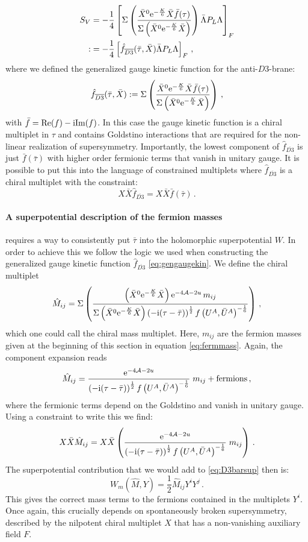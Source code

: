 \documentclass[a4paper,12pt,twoside,openright]{report}
\newcommand{\be}{\begin{equation}}
\newcommand{\ee}{\end{equation}}
\newcommand{\bea}{\begin{equation}\begin{aligned}}
\newcommand{\eea}{\end{aligned}\end{equation}}
\def\rmi{{\rm i}}
\def\rme{{\rm e}}
\def\rmre{{\rm Re}}
\def\rmim{{\rm Im}}
\begin{document}
\bea 
S_V &= -\frac{1}{4} \left[\Sigma\left(\frac{\bar{X}^0 \rme^{-\frac{K}{6}} \bar{X} \bar{f}(\tau)}{\Sigma \left(\bar{X}^0\rme^{-\frac{K}{6}}\bar{X}\right)}\right)\bar{\Lambda}P_L\Lambda\right]_F\\
:&= -\frac{1}{4} \left[\hat{f}_{\overline{D3}}(\bar{\tau},\bar{X})\bar{\Lambda}P_L\Lambda\right]_F\,,
\eea 
where we defined the generalized gauge kinetic function for the anti-$D3$-brane:
\bea 
\hat{f}_{\overline{D3}}(\bar{\tau},\bar{X}) := \Sigma\left(\frac{\bar{X}^0 \rme^{-\frac{K}{6}} \bar{X} \bar{f}(\tau)}{\Sigma \left(\bar{X}^0\rme^{-\frac{K}{6}}\bar{X}\right)}\right)\,,
\label{eq:gengaugekin}
\eea
with $\bar{f} = \rmre(f)-\rmi \rmim(f)$. In this case the gauge kinetic function is a chiral multiplet in $\tau$ and contains Goldstino interactions that are required for the non-linear realization of supersymmetry. Importantly, the lowest component of $\hat{f}_{\overline{D3}}$ is just $\bar{f}(\bar{\tau})$ with higher order fermionic terms that vanish in unitary gauge. It is possible to put this into the language of constrained multiplets where $\hat{f}_{\overline{D3}}$ is a chiral multiplet with the constraint:
\be 
X\bar{X}\hat{f}_{\overline{D3}} = X \bar{X}\bar{f}(\bar{\tau})\,.
\ee

\paragraph{A superpotential description of the fermion masses} requires a way to consistently put $\bar{\tau}$ into the holomorphic superpotential $W$. In order to achieve this we follow the logic we used when constructing the generalized gauge kinetic function $\hat{f}_{\overline{D3}}$ \eqref{eq:gengaugekin}. We define the chiral multiplet
\be 
\hat{M}_{ij} = \Sigma \left(\frac{\left(\bar{X}^0 \rme^{-\frac{K}{6}}\bar{X}\right)\rme^{-4\mathcal{A}-2u}\,m_{ij}}{\Sigma\left(\bar{X}^0 \rme^{-\frac{K}{6}}\bar{X}\right)\left(-\rmi (\tau-\bar{\tau})\right)^{\frac{1}{2}}f\left(U^A,\bar{U}^A\right)^{-\frac{1}{6}}}\right)\,,
\ee
which one could call the chiral mass multiplet. Here, $m_{ij}$ are the fermion masses given at the beginning of this section in equation \eqref{eq:fermmass}. Again, the component expansion reads
\be 
\hat{M}_{ij} = \frac{\rme^{-4\mathcal{A}-2u}}{\left(-\rmi (\tau-\bar{\tau})\right)^{\frac{1}{2}}f\left(U^A,\bar{U}^A\right)^{-\frac{1}{6}}} \; m_{ij} + \text{fermions}\,,
\ee
where the fermionic terms depend on the Goldstino and vanish in unitary gauge. Using a constraint to write this we find:
\be 
X\bar{X} \hat{M}_{ij} = X \bar{X} \left( \frac{\rme^{-4\mathcal{A}-2u}}{\left(-\rmi (\tau-\bar{\tau})\right)^{\frac{1}{2}}f\left(U^A,\bar{U}^A\right)^{-\frac{1}{6}}}\; m_{ij} \right)\,.
\ee 
The superpotential contribution that we would add to \eqref{eq:D3barsup} then is:
\be 
W_m(\hat{M},Y) = \frac{1}{2} \hat{M}_{ij}Y^iY^j\,.
\ee
This gives the correct mass terms to the fermions contained in the multiplets $Y^i$. Once again, this crucially depends on spontaneously broken supersymmetry, described by the nilpotent chiral multiplet $X$ that has a non-vanishing auxiliary field $F$.
\end{document}
